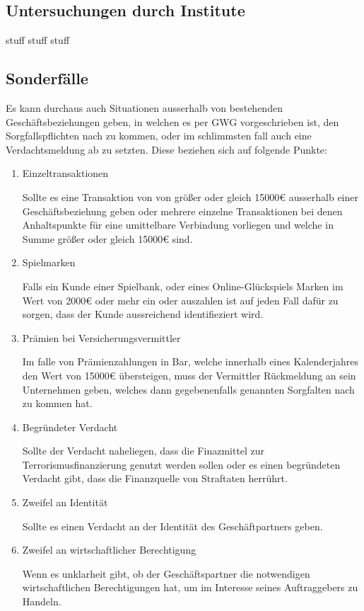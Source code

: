 \documentclass{article}
\begin{document}
        \subsection[Untersuchungen durch Institute]{Untersuchungen durch Institute}

            stuff stuff stuff


        \subsection[Sonderfälle]{Sonderfälle}

        Es kann durchaus auch Situationen ausserhalb von bestehenden Geschäftsbeziehungen geben, in welchen es per GWG vorgeschrieben ist, den Sorgfallspflichten nach zu kommen, oder im schlimmsten fall auch eine Verdachtsmeldung ab zu setzten. Diese beziehen sich auf folgende Punkte:

        \begin{enumerate}

            \item Einzeltransaktionen

                Sollte es eine Transaktion von von größer oder gleich 15000€ ausserhalb einer Geschäftsbeziehung geben oder mehrere einzelne Transaktionen bei denen Anhaltspunkte für eine umittelbare Verbindung vorliegen und welche in Summe größer oder gleich 15000€ sind.

            \item Spielmarken

                Falls ein Kunde einer Spielbank, oder eines Online-Glückspiels Marken im Wert von 2000€ oder mehr ein oder auszahlen ist auf jeden Fall dafür zu sorgen, dass der Kunde aussreichend identifieziert wird.

            \item Prämien bei Versicherungsvermittler

                Im falle von Prämienzahlungen in Bar, welche innerhalb eines Kalenderjahres den Wert von 15000€ übersteigen, muss der Vermittler Rückmeldung an sein Unternehmen geben, welches dann gegebenenfalls genannten Sorgfalten nach zu kommen hat.

            \item Begründeter Verdacht 

                Sollte der Verdacht naheliegen, dass die Finazmittel zur Terrorismusfinanzierung genutzt werden sollen oder es einen begründeten Verdacht gibt, dass die Finanzquelle von Straftaten herrührt.

            \item Zweifel an Identität

                Sollte es einen Verdacht an der Identität des Geschäftpartners geben.

            \item Zweifel an wirtschaftlicher Berechtigung

                Wenn es unklarheit gibt, ob der Geschäftspartner die notwendigen wirtschaftlichen Berechtigungen hat, um im Interesse seines Auftraggebers zu Handeln.

        \end{enumerate}    
    
\end{document}

